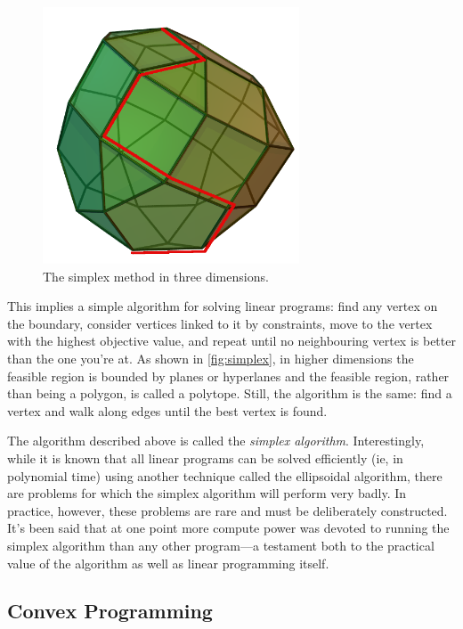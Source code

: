\documentclass{article}
\begin{document}
\begin{figure}
\centering
\includegraphics[width=3in]{imgs/Simplex-method-3-dimensions.png}
\caption{The simplex method in three dimensions.\label{fig:simplex}}
\end{figure}

This implies a simple algorithm for solving linear programs: find any vertex on the boundary, consider vertices linked to it by constraints, move to the vertex with the highest objective value, and repeat until no neighbouring vertex is better than the one you're at. As shown in \autoref{fig:simplex}, in higher dimensions the feasible region is bounded by planes or hyperlanes and the feasible region, rather than being a polygon, is called a polytope. Still, the algorithm is the same: find a vertex and walk along edges until the best vertex is found.

The algorithm described above is called the \textit{simplex algorithm}. Interestingly, while it is known that all linear programs can be solved efficiently (ie, in polynomial time) using another technique called the ellipsoidal algorithm, there are problems for which the simplex algorithm will perform very badly. In practice, however, these problems are rare and must be deliberately constructed. It's been said that at one point more compute power was devoted to running the simplex algorithm than any other program---a testament both to the practical value of the algorithm as well as linear programming itself.


\subsection{Convex Programming}
\label{sec:convex_programming}
\end{document}
